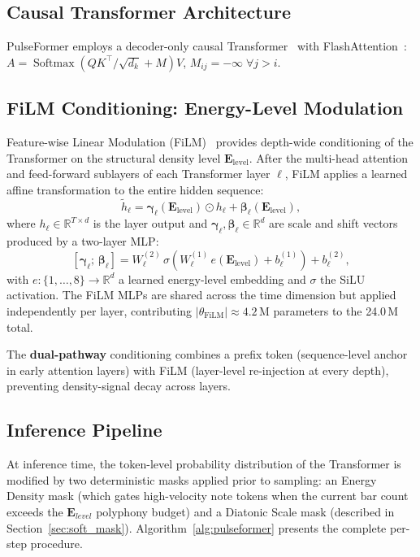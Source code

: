 \documentclass[pdflatex,sn-mathphys-num,twocolumn]{sn-jnl}
\theoremstyle{thmstyleone}
\theoremstyle{thmstyletwo}
\begin{document}
\subsection{Causal Transformer Architecture}
PulseFormer employs a decoder-only causal Transformer~\cite{vaswani2017attention} with FlashAttention~\cite{dao2022flashattention}:
$A = \operatorname{Softmax}\!\left({QK^\top}/{\sqrt{d_k}} + M\right)V$, $M_{ij}=-\infty\;\forall j>i$.

\subsection{FiLM Conditioning: Energy-Level Modulation}
\label{sec:film}
Feature-wise Linear Modulation (FiLM)~\cite{perez2018film} provides depth-wide conditioning of the Transformer on the structural density level $\mathbf{E}_{\mathrm{level}}$. After the multi-head attention and feed-forward sublayers of each Transformer layer $\ell$, FiLM applies a learned affine transformation to the entire hidden sequence:
\begin{equation}\label{eq:film}
  \tilde{h}_\ell = \boldsymbol{\gamma}_\ell(\mathbf{E}_{\mathrm{level}}) \odot h_\ell
                 + \boldsymbol{\beta}_\ell(\mathbf{E}_{\mathrm{level}}),
\end{equation}
where $h_\ell \in \mathbb{R}^{T \times d}$ is the layer output and $\boldsymbol{\gamma}_\ell,\boldsymbol{\beta}_\ell \in \mathbb{R}^d$ are scale and shift vectors produced by a two-layer MLP:
\begin{equation}\label{eq:film_mlp}
  [\boldsymbol{\gamma}_\ell;\,\boldsymbol{\beta}_\ell]
    = W_\ell^{(2)}\,\sigma\!\left(W_\ell^{(1)}\,e(\mathbf{E}_{\mathrm{level}})+b_\ell^{(1)}\right)+b_\ell^{(2)},
\end{equation}
with $e:\{1,\dots,8\}\!\to\!\mathbb{R}^d$ a learned energy-level embedding and $\sigma$ the SiLU activation. The FiLM MLPs are shared across the time dimension but applied independently per layer, contributing $|\theta_{\mathrm{FiLM}}|\approx4.2\,\mathrm{M}$ parameters to the 24.0\,M total.

The \textbf{dual-pathway} conditioning combines a prefix token (sequence-level anchor in early attention layers) with FiLM (layer-level re-injection at every depth), preventing density-signal decay across layers.

\subsection{Inference Pipeline}
At inference time, the token-level probability distribution of the Transformer is modified by two deterministic masks applied prior to sampling: an Energy Density mask (which gates high-velocity note tokens when the current bar count exceeds the $\mathbf{E}_{level}$ polyphony budget) and a Diatonic Scale mask (described in Section~\ref{sec:soft_mask}). Algorithm~\ref{alg:pulseformer} presents the complete per-step procedure.
\end{document}
